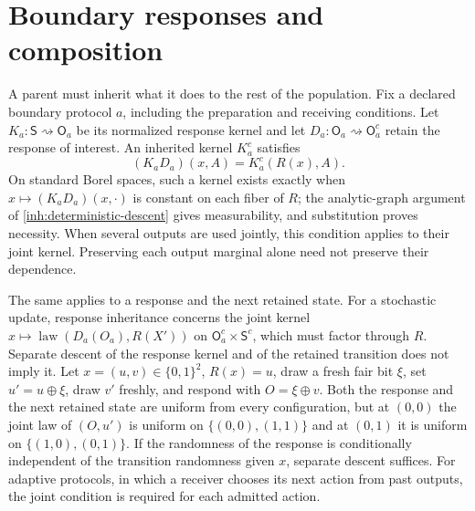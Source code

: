 \section{Boundary responses and composition}

A parent must inherit what it does to the rest of the population. Fix a
declared boundary protocol $a$, including the preparation and receiving
conditions. Let $K_a:\mathsf S\rightsquigarrow\mathsf O_a$ be its
normalized response kernel and let
$D_a:\mathsf O_a\rightsquigarrow\mathsf O_a^c$ retain the response of
interest. An inherited kernel $K_a^c$ satisfies
\begin{equation}
 (K_aD_a)(x,A)=K_a^c(R(x),A).
 \label{inh:boundary-square}
\end{equation}
On standard Borel spaces, such a kernel exists exactly when
$x\mapsto(K_aD_a)(x,\cdot)$ is constant on each fiber of $R$; the
analytic-graph argument of \cref{inh:deterministic-descent} gives
measurability, and substitution proves necessity. When several outputs are
used jointly, this condition applies to their joint kernel. Preserving each
output marginal alone need not preserve their dependence.

The same applies to a response and the next retained state. For a
stochastic update, response inheritance concerns the joint kernel
$x\mapsto\operatorname{law}(D_a(O_a),R(X'))$ on
$\mathsf O_a^c\times\mathsf S^c$, which must factor through $R$. Separate
descent of the response kernel and of the retained transition does not imply
it. Let $x=(u,v)\in\{0,1\}^2$, $R(x)=u$, draw a fresh fair bit $\xi$, set
$u'=u\oplus\xi$, draw $v'$ freshly, and respond with $O=\xi\oplus v$. Both
the response and the next retained state are uniform from every
configuration, but at $(0,0)$ the joint law of $(O,u')$ is uniform on
$\{(0,0),(1,1)\}$ and at $(0,1)$ it is uniform on $\{(1,0),(0,1)\}$. If the
randomness of the response is conditionally independent of the transition
randomness given $x$, separate descent suffices. For adaptive protocols, in
which a receiver chooses its next action from past outputs, the joint
condition is required for each admitted action.


